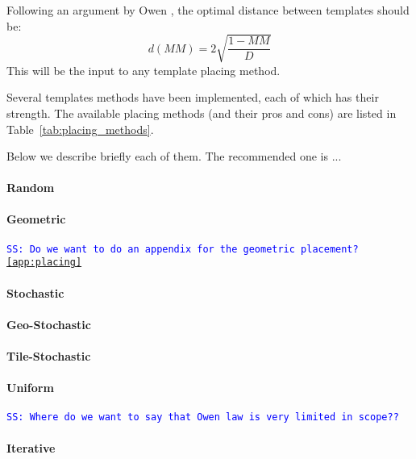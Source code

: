 \documentclass[twocolumn,showpacs,preprintnumbers,nofootinbib,prd,
superscriptaddress,10pt]{revtex4-1}
\newcommand{\stefano}[1]{{\textcolor{blue}{\texttt{SS: #1}} }}
\begin{document}
Following an argument by Owen \cite{owen_metric}, the optimal distance between templates should be:
\begin{equation}
	d(MM) = 2 \sqrt{\frac{1-MM}{D}}
\end{equation}
This will be the input to any template placing method.

Several templates methods have been implemented, each of which has their strength. The available placing methods (and their pros and cons) are listed in Table~\ref{tab:placing_methods}.

Below we describe briefly each of them. The recommended one is ...

\paragraph{Random}\label{par:random}
\paragraph{Geometric}\label{par:geometric}
\stefano{Do we want to do an appendix for the geometric placement? \ref{app:placing}}
\paragraph{Stochastic}\label{par:stochastic}
\paragraph{Geo-Stochastic}\label{par:geostochastic}
\paragraph{Tile-Stochastic}\label{par:tilestochastic}
\paragraph{Uniform}\label{par:uniform}
\stefano{Where do we want to say that Owen law is very limited in scope??}
\paragraph{Iterative}\label{par:iterative}
\end{document}
